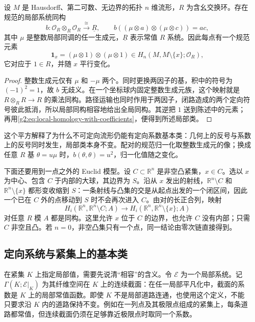 \begin{proposition}\label{g2:prop:orientation-square}
	设 \(M\) 是 Hausdorff、第二可数、无边界的拓扑 \(n\) 维流形，\(R\) 为含幺交换环。存在规范的局部系统同构
	\begin{equation}\label{g2:eq:orientation-square}
		b:\mathcal O_R\otimes_R\mathcal O_R\xrightarrow{\ \cong\ }\underline R,
		\qquad b((\mu\otimes a)\otimes(\mu\otimes c))=ac,
	\end{equation}
	其中 \(\mu\) 是整数局部同调的任一生成元，\(\underline R\) 表示常值 \(R\) 系统。因此每点有一个规范元素
	\[
		\mathbf 1_x=(\mu\otimes1)\otimes(\mu\otimes1)
		\in H_n(M,M\setminus\{x\};\mathcal O_R),
	\]
	它对应于 \(1\in R\)，并随 \(x\) 平行变化。
\end{proposition}
\begin{proof}
	整数生成元仅有 \(\mu\) 和 \(-\mu\) 两个。同时更换两因子的基，积中的符号为 \((-1)^2=1\)，故 \(b\) 无歧义。在一个坐标球内固定整数生成元族，这个映射就是 \(R\otimes_RR\to R\) 的乘法同构。路径运输也同时作用于两因子，闭路造成的两个定向符号彼此抵消，所以局部同构相容地给出全局同构。其逆把 \(1\) 送到陈述中的元素；再用\eqref{g2:eq:local-homology-with-coefficients}，便得到所述局部类。
\end{proof}

这个平方解释了为什么不可定向流形仍能有定向系数基本类：几何上的反号与系数上的反号同时发生，局部类本身不变。配对的规范归一化取整数生成元的像；换成任意 \(R\) 基 \(\theta=u\mu\) 时，\(b(\theta,\theta)=u^2\)，归一化值随之变化。

\ProseParagraphBreak

下面还要用到一点之外的 Euclid 模型。设 \(C\subset\mathbb R^n\) 是非空凸紧集，\(x\in C\)。选以 \(x\) 为中心、包含 \(C\) 于内部的大球，其边界为 \(S\)。沿从 \(x\) 发出的射线，\(\mathbb R^n\setminus C\) 和 \(\mathbb R^n\setminus\{x\}\) 都形变收缩到 \(S\)：一条射线与凸集的交是从起点出发的一个闭区间，因此一个已在 \(C\) 外的点移动到 \(S\) 时不会再次进入 \(C\)。由对的长正合列，映射
\begin{equation}\label{g2:eq:convex-local-class}
	H_i(\mathbb R^n,\mathbb R^n\setminus C;A)
	\longrightarrow H_i(\mathbb R^n,\mathbb R^n\setminus\{x\};A)
\end{equation}
对任意 \(R\) 模 \(A\) 都是同构。这里允许 \(x\) 位于 \(C\) 的边界，也允许 \(C\) 没有内部；只需 \(C\) 非空且凸。若 \(n=0\)，非空凸集只有一个点，同一结论由零次链直接得到。

\subsection{定向系统与紧集上的基本类}
\label{g2:subsec:0601:02}
在紧集 \(K\) 上指定局部值，需要先说清“相容”的含义。令 \(\mathcal E\) 为一个局部系统。记 \(\Gamma(K;\mathcal E|_K)\) 为其纤维空间在 \(K\) 上的连续截面：在任一局部平凡化中，截面的系数是 \(K\) 上的局部常值函数。即使 \(K\) 不是局部道路连通，也使用这个定义，不能只要求沿 \(K\) 内的道路保持不变。例如在一列点及其极限点组成的紧集上，每条道路都常值，但连续截面仍须在足够靠近极限点时取同一个系数。

